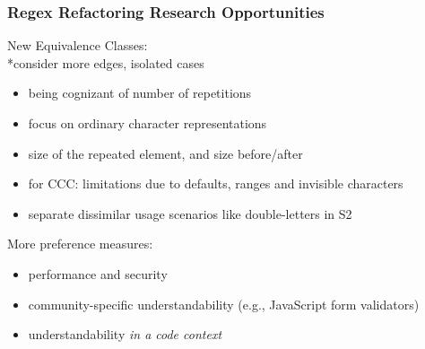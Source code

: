 \begin{frame}
\frametitle{Regex Refactoring Research Opportunities}

\begin{block}{\begin{Large}New Equivalence Classes:
\\*consider more edges, isolated cases\end{Large}}
\begin{itemize}
\item being cognizant of number of repetitions
\item focus on ordinary character representations
\item size of the repeated element, and size before/after
\item for CCC: limitations due to defaults, ranges and invisible characters
\item separate dissimilar usage scenarios like double-letters in S2
\end{itemize}
\end{block}

\begin{block}{\begin{Large}More preference measures:\end{Large}}
\begin{itemize}
\item performance and security
\item community-specific understandability (e.g., JavaScript form validators)
\item understandability \emph{in a code context}
\end{itemize}
\end{block}
\end{frame}



